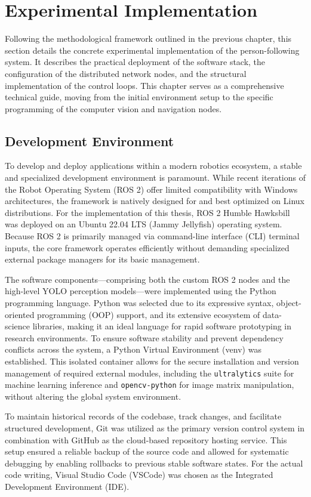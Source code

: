 \chapter{Experimental Implementation}
Following the methodological framework outlined in the previous chapter, this section details the concrete experimental implementation of the person-following system. It describes the practical deployment of the software stack, the configuration of the distributed network nodes, and the structural implementation of the control loops. This chapter serves as a comprehensive technical guide, moving from the initial environment setup to the specific programming of the computer vision and navigation nodes.

\section{Development Environment}
To develop and deploy applications within a modern robotics ecosystem, a stable and specialized development environment is paramount. While recent iterations of the Robot Operating System (ROS 2) offer limited compatibility with Windows architectures, the framework is natively designed for and best optimized on Linux distributions. For the implementation of this thesis, ROS 2 Humble Hawksbill was deployed on an Ubuntu 22.04 LTS (Jammy Jellyfish) operating system. Because ROS 2 is primarily managed via command-line interface (CLI) terminal inputs, the core framework operates efficiently without demanding specialized external package managers for its basic management.

The software components—comprising both the custom ROS 2 nodes and the high-level YOLO perception models—were implemented using the Python programming language. Python was selected due to its expressive syntax, object-oriented programming (OOP) support, and its extensive ecosystem of data-science libraries, making it an ideal language for rapid software prototyping in research environments. To ensure software stability and prevent dependency conflicts across the system, a Python Virtual Environment (venv) was established. This isolated container allows for the secure installation and version management of required external modules, including the \texttt{ultralytics} suite for machine learning inference and \texttt{opencv-python} for image matrix manipulation, without altering the global system environment.

To maintain historical records of the codebase, track changes, and facilitate structured development, Git was utilized as the primary version control system in combination with GitHub as the cloud-based repository hosting service. This setup ensured a reliable backup of the source code and allowed for systematic debugging by enabling rollbacks to previous stable software states. For the actual code writing, Visual Studio Code (VSCode) was chosen as the Integrated Development Environment (IDE). 

